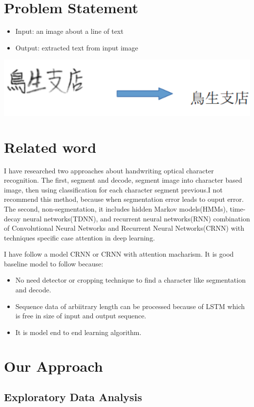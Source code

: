 \documentclass[14pt]{extarticle}
\newcommand{\<}{\langle}
\renewcommand{\>}{\rangle}
\theoremstyle{definition}
\begin{document}
\section{Problem Statement}
\begin{itemize}
    \item Input: an image about a line of text 
    \item Output: extracted text from input image
\end{itemize}
\includegraphics[width=170mm,scale=0.7]{statement.png}
\section{Related word}
 I have researched two approaches about handwriting optical character recognition. The first, segment and decode, segment image into character based image, then using classification for each character segment previous.I not recommend this method, because when segmentation error leads to ouput error.  The second, non-segmentation, it includes hidden Markov models(HMMs), time-decay neural networks(TDNN), and recurrent neural networks(RNN) combination of Convolutional Neural Networks and Recurrent Neural Networks(CRNN) with techniques specific case attention in deep learning\cite{crnn}. 

I have follow a model CRNN or CRNN with attention macharism. It is good baseline model to follow because:  
\begin{itemize}
    \item No need detector or cropping technique to find a character like segmentation and decode. 
    \item Sequence data of arbiitrary length can be processed because of LSTM which is free in size of input and output sequence. 
    \item It is model end to end learning algorithm. 
\end{itemize}
\section{Our Approach}
\subsection{Exploratory Data Analysis}
\end{document}
